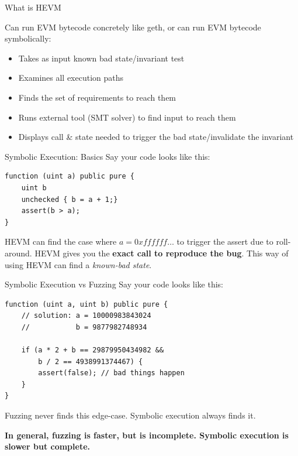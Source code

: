 \documentclass{beamer}
\begin{document}
\begin{frame}{What is HEVM}

Can run EVM bytecode concretely like geth, or can run EVM bytecode symbolically:
\begin{itemize}
\item Takes as input known bad state/invariant test
\item Examines all execution paths
\item Finds the set of requirements to reach them
\item Runs external tool (SMT solver) to find input to reach them
\item Displays call \& state needed to trigger the bad state/invalidate the invariant
\end{itemize}
\end{frame}

\begin{frame}[fragile=singleslide]{Symbolic Execution: Basics}
Say your code looks like this:
\begin{Verbatim}[frame=single, framerule=0.2mm, framesep=2mm,fontsize=\small]
function (uint a) public pure {
	uint b
	unchecked { b = a + 1;}
	assert(b > a);
}
\end{Verbatim}


HEVM can find the case where $a=0xffffff\ldots$ to trigger the assert due to roll-around. HEVM gives you the \textbf{exact call to reproduce the bug}. This way of using HEVM can find a \emph{known-bad state}.

\end{frame}

\begin{frame}[fragile=singleslide]{Symbolic Execution vs Fuzzing}
Say your code looks like this:

\begin{Verbatim}[frame=single, framerule=0.2mm, framesep=2mm,fontsize=\small]
function (uint a, uint b) public pure {	
	// solution: a = 10000983843024
	//           b = 9877982748934
	
	if (a * 2 + b == 29879950434982 &&
	    b / 2 == 4938991374467) {
		assert(false); // bad things happen
	}
}
\end{Verbatim}

Fuzzing never finds this edge-case. Symbolic execution always finds it.
\bigskip 

\textbf{In general, fuzzing is faster, but is incomplete. Symbolic execution is slower but complete.}

\end{frame}
\end{document}
